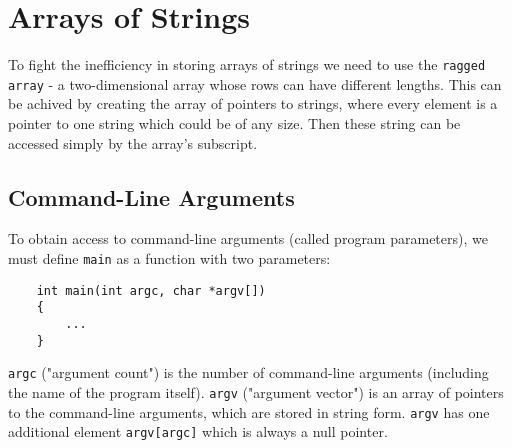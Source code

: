 \documentclass[openany]{book}
\begin{document}
    \section{Arrays of Strings}

    To fight the inefficiency in storing arrays of strings we need to use the \texttt{ragged array} - a two-dimensional array whose rows can have different lengths. This can be achived by creating the array of pointers to strings, where every element is a pointer to one string which could be of any size. Then these string can be accessed simply by the array's subscript.

    \subsection*{Command-Line Arguments}

    To obtain access to command-line arguments (called program parameters), we must define \texttt{main} as a function with two parameters:
    \begin{lstlisting}
    int main(int argc, char *argv[])
    {
        ...
    }
    \end{lstlisting}

    \texttt{argc} ("argument count") is the number of command-line arguments (including the name of the program itself). \texttt{argv} ("argument vector") is an array of pointers to the command-line arguments, which are stored in string form. \texttt{argv} has one additional element \texttt{argv[argc]} which is always a null pointer.
\end{document}
